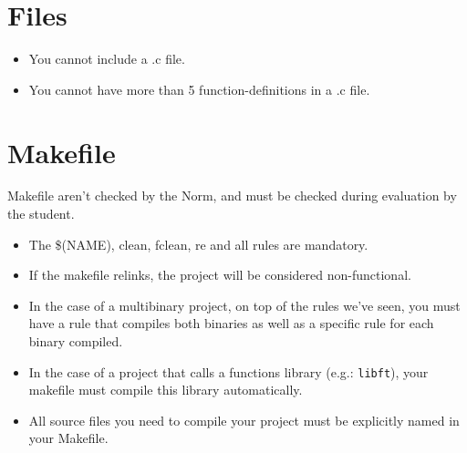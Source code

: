 \documentclass{42-en}
\begin{document}
    \section{Files}

        \begin{itemize}

            \item You cannot include a .c file.

            \item You cannot have more than 5 function-definitions in a .c file.

        \end{itemize}
        \newpage


    \section{Makefile}

            Makefile aren't checked by the Norm, and must be checked during evaluation by 
            the student.
            \begin{itemize}

                \item The \$(NAME), clean, fclean, re and all
                  rules are mandatory.

                \item If the makefile relinks, the project will be considered
                  non-functional.

                  \item In the case of a multibinary project, on top of the
                  rules we've seen, you must have a rule that compiles
                  both binaries as well as a specific rule for each
                  binary compiled.

                  \item In the case of a project that calls a functions library
                  (e.g.: \texttt{libft}), your makefile must compile
                  this library automatically.

                  \item All source files you need to compile your project must
                    be explicitly named in your Makefile.

            \end{itemize}
\end{document}
